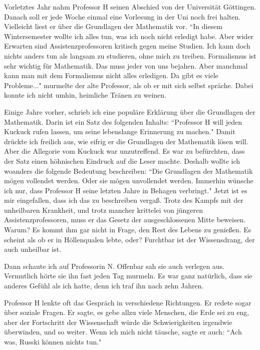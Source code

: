 \documentclass[12pt,a4j,twocolumn]{jarticle}
\begin{document}
Vorletztes Jahr nahm Professor H seinen Abschied von der Universit\"at G\"ottingen.
Danach soll er jede Woche einmal eine Vorlesung in der Uni noch frei halten.
Vielleicht liest er \"uber die Grundlagen der Mathematik vor.
``In diesem Wintersemester wollte ich alles tun, was ich noch nicht erledigt habe.
Aber wider Erwarten sind Assistenzprofessoren kritisch gegen meine Studien.
Ich kann doch nichts anders tun als langsam zu studieren, ohne mich zu treiben.
Formalismus ist sehr wichtig f\"ur Mathematik.
Das muss jeder von uns bejahen.
Aber manchmal kann man mit dem Formalismus nicht alles erledigen.
Da gibt es viele Probleme..." murmelte der alte Professor,
als ob er mit sich selbst spr\"ache.
Dabei konnte ich nicht umhin, heimliche Tr\"anen zu weinen.

Einige Jahre vorher, schrieb ich eine popul\"are
Erkl\"arung \"uber die Grundlagen der Mathematik.
Darin ist ein Satz des folgenden Inhalts:
``Professor H will jeden Kuckuck rufen lassen, um seine lebenslange Erinnerung zu machen."
Damit dr\"uckte ich freilich aus, wie eifrig er die Grundlagen der Mathematik l\"osen will.
Aber die Allegorie vom Kuckuck war unzutreffend.
Es war zu bef\"urchten, dass der Satz einen h\"ohnischen Eindruck auf die Leser machte.
Deshalb wollte ich woanders die folgende Bedeutung beschreiben:
``Die Grundlagen der Mathematik m\"ogen vollendet werden. 
Oder sie m\"ogen unvollendet werden.
Immerhin w\"unsche ich nur, dass Professor H seine letzten Jahre in Behagen verbringt."
Jetzt ist es mir eingefallen, dass ich das zu beschreiben verga\ss.
Trotz des Kampfs mit der unheilbaren Krankheit,
und trotz mancher krittelei von j\"ungeren Assistenzprofessoren,
muss er das Gesetz der ausgeschlossenen Mitte beweisen. Warum?
Es kommt ihm gar nicht in Frage, den Rest des Lebens zu genie\ss en.
Es scheint als ob er in H\"ollenqualen lebte, oder?
Furchtbar ist der Wissensdrang, der auch unheilbar ist.

Dann schaute ich auf Professorin N. Offenbar sah sie auch verlegen aus.
Vermutlich h\"orte sie ihn fast jeden Tag murmeln.
Es war ganz nat\"urlich, dass sie anderes Gef\"uhl als ich hatte,
denn ich traf ihn nach zehn Jahren.

Professor H lenkte oft das Gespr\"ach in verschiedene Richtungen.
Er redete sogar \"uber soziale Fragen.
Er sagte, es gebe allzu viele Menschen, die Erde sei zu eng,
aber der Fortschritt der Wissenschaft w\"urde die Schwierigkeiten irgendwie \"uberwinden,
und so weiter. Wenn ich mich nicht t\"ausche, sagte er auch:
``Ach was, Russki k\"onnen nichts tun."
\end{document}
